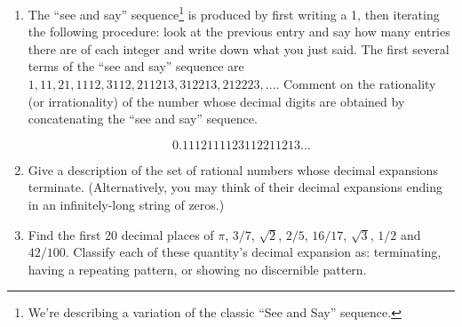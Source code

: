 \begin{enumerate}
\vfill


\vfill

\textbookpagebreak

\item The ``see and say'' sequence\footnote{We're describing a variation of the classic ``See and Say'' sequence.} is produced by first writing a 1, 
then iterating the following procedure:  look at the previous entry 
and say how many entries there are of each integer and write down what 
you just said.  The first several terms of the ``see and say'' sequence 
are $1, 11, 21, 1112, 3112, 211213, 312213, 212223, \ldots$.  Comment on the
rationality (or irrationality) of the number whose decimal digits are obtained 
by concatenating the ``see and say'' sequence.

\[ 0.1112111123112211213... \]

\vfill

\vfill

\workbookpagebreak

\item Give a description of the set of rational numbers whose decimal
expansions terminate.  (Alternatively, you may think of their decimal
expansions ending in an infinitely-long string of zeros.)


\vfill

\item Find the first 20 decimal places of $\pi$, $3/7$, $\sqrt{2}$, 
  $2/5$, $16/17$, $\sqrt{3}$, $1/2$ and $42/100$.  Classify each of
these quantity's decimal expansion as: terminating, having a repeating
pattern, or showing no discernible pattern.

\end{enumerate}
